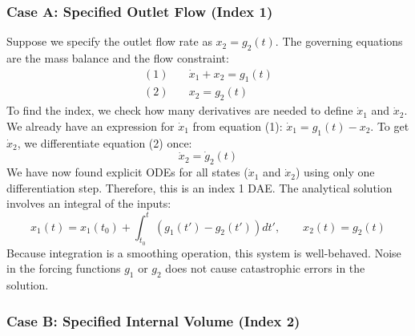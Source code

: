 \subsubsection{Case A: Specified Outlet Flow (Index 1)}

Suppose we specify the outlet flow rate as $x_2 = g_2(t)$. The governing equations are the mass balance and the flow constraint:
\begin{align}
    (1) \quad & \dot{x}_1 + x_2 = g_1(t) \\
    (2) \quad & x_2 = g_2(t)
\end{align}
To find the index, we check how many derivatives are needed to define $\dot{x}_1$ and $\dot{x}_2$. We already have an expression for $\dot{x}_1$ from equation (1): $\dot{x}_1 = g_1(t) - x_2$. To get $\dot{x}_2$, we differentiate equation (2) once:
\begin{equation}
    \dot{x}_2 = \dot{g}_2(t)
\end{equation}
We have now found explicit ODEs for all states ($\dot{x}_1$ and $\dot{x}_2$) using only one differentiation step. Therefore, this is an index 1 DAE. The analytical solution involves an integral of the inputs:
\begin{equation}
    x_1(t) = x_1(t_0) + \int_{t_0}^t (g_1(t') - g_2(t')) dt', \qquad x_2(t) = g_2(t)
\end{equation}
Because integration is a smoothing operation, this system is well-behaved. Noise in the forcing functions $g_1$ or $g_2$ does not cause catastrophic errors in the solution.

\subsubsection{Case B: Specified Internal Volume (Index 2)}


